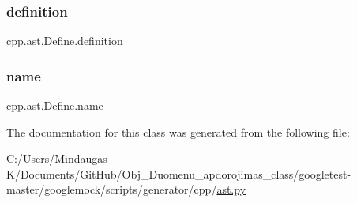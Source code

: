 \subsubsection{\texorpdfstring{definition}{definition}}
{\footnotesize\ttfamily cpp.\+ast.\+Define.\+definition}

\mbox{\label{classcpp_1_1ast_1_1_define_a8879216f09e88f79d7baa49bcfa10ebd}} 
\subsubsection{\texorpdfstring{name}{name}}
{\footnotesize\ttfamily cpp.\+ast.\+Define.\+name}



The documentation for this class was generated from the following file\+:\begin{DoxyCompactItemize}
\item 
C\+:/\+Users/\+Mindaugas K/\+Documents/\+Git\+Hub/\+Obj\+\_\+\+Duomenu\+\_\+apdorojimas\+\_\+class/googletest-\/master/googlemock/scripts/generator/cpp/\mbox{\hyperlink{googletest-master_2googlemock_2scripts_2generator_2cpp_2ast_8py}{ast.\+py}}\end{DoxyCompactItemize}
